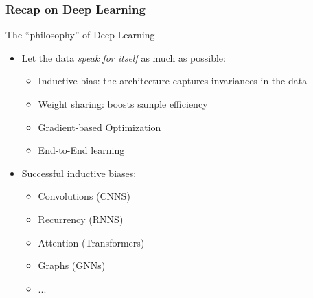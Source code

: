 \documentclass[10pt]{beamer}
\begin{document}
\begin{frame}
  \frametitle{Recap on Deep Learning}
	The ``philosophy'' of Deep Learning
	\vspace{.25cm}
	\begin{itemize}
	\item Let the data \emph{speak for itself} as much as possible:
	\begin{itemize}
	\vspace{.1cm}	\item {\color{blue} Inductive bias}: the architecture captures invariances in the data
	\vspace{.1cm}	\item {\color{blue} Weight sharing}: boosts sample efficiency
	\vspace{.1cm}	\item {\color{blue} Gradient-based} Optimization
	\vspace{.1cm}	\item {\color{blue} End-to-End} learning
	\end{itemize}
	\vspace{.25cm}
	\item Successful inductive biases:
	\begin{itemize}
	\vspace{.1cm}	\item Convolutions (CNNS)
	\vspace{.1cm}	\item Recurrency (RNNS)
	\vspace{.1cm}	\item Attention (Transformers)
	\vspace{.1cm}	\item Graphs (GNNs)
	\item ...
	\end{itemize}
	\end{itemize}
\end{frame}
\end{document}
